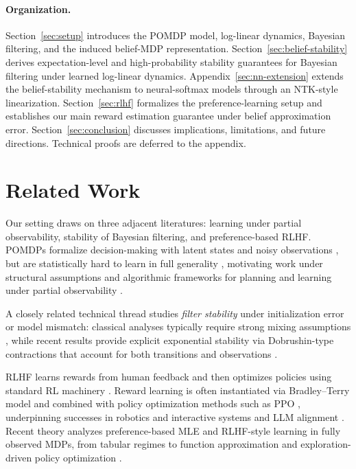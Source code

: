 \documentclass[10pt]{article} %
\theoremstyle{plain}
\theoremstyle{definition}
\theoremstyle{remark}
\begin{document}
\paragraph{Organization.}
Section~\ref{sec:setup} introduces the POMDP model, log-linear dynamics, Bayesian filtering, and the induced belief-MDP representation.
Section~\ref{sec:belief-stability} derives expectation-level and high-probability stability guarantees for Bayesian filtering under learned log-linear dynamics. Appendix~\ref{sec:nn-extension} extends the belief-stability mechanism to neural-softmax models through an NTK-style linearization.
Section~\ref{sec:rlhf} formalizes the preference-learning setup and establishes our main reward estimation guarantee under belief approximation error.
Section~\ref{sec:conclusion} discusses implications, limitations, and future directions.
Technical proofs are deferred to the appendix.


\section{Related Work}
\label{sec:related_work}

Our setting draws on three adjacent literatures: learning under partial observability, stability of Bayesian filtering, and preference-based RLHF. POMDPs formalize decision-making with latent states and noisy observations \citep{Astrom1965}, but are statistically hard to learn in full generality \citep{Krishnamurthy2016, Jin2020}, motivating work under structural assumptions and algorithmic frameworks for planning and learning under partial observability \citep{KAELBLING199899, Du2019, liu2022sample, Golowich2022, Zhan2022, cayci2024recurrent}.

A closely related technical thread studies \emph{filter stability} under initialization error or model mismatch: classical analyses typically require strong mixing assumptions \citep{VanHandel2008}, while recent results provide explicit exponential stability via Dobrushin-type contractions that account for both transitions and observations \citep{Mcdonald2024StochasticCriteria}.

RLHF learns rewards from human feedback and then optimizes policies using standard RL machinery \citep{ChristianoLBMLA17, Wirth2017, Ji2023}. Reward learning is often instantiated via Bradley--Terry model \citep{Bradley1952, Plackett1975} and combined with policy optimization methods such as PPO \citep{Schulman2017}, underpinning successes in robotics and interactive systems \citep{Brown2019} and LLM alignment \citep{Ziegler2019, Stiennon2020, Bai2022, Ouyang2022, Achiam2023}. Recent theory analyzes preference-based MLE and RLHF-style learning in fully observed MDPs, from tabular regimes to function approximation and exploration-driven policy optimization \citep{Novoseller2020, Chen2022, ZhuPrincipledComparisons, Du2024Exploration-DrivenUtilization, kaufmann2025a, Saha2023}.
\end{document}
